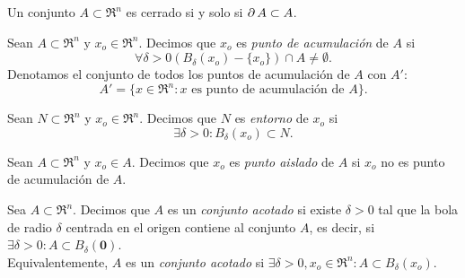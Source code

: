    \begin{propertie} \label{prop:cerrado_front}
    Un conjunto $A \subset \Re^n$ es cerrado si y solo si $\operatorname{\partial} A \subset A$.
   \end{propertie}
   
   \begin{definition}  \label{def:pto_acum}
    Sean $A \subset \Re^n \text{ y } x_o \in \Re^n$. Decimos que $x_o$ es \emph{punto de acumulaci\'on} de $A$ si
    \[
     \forall \delta > 0 \left( B_{\delta}(x_o) - \{ x_o \} \right) \cap A \ne \emptyset. 
    \]
    Denotamos el conjunto de todos los puntos de acumulaci\'on de $A$ con $A'$:
    \[
     A' = \{ x \in \Re^n : x \text{ es punto de acumulaci\'on de } A \}.
    \]
   
   \end{definition}
   
   \begin{definition}  \label{def:entorno}
    Sean $N \subset  \Re^n$ y $x_o \in \Re^n$. Decimos que $N$ es \emph{entorno} de $x_o$ si
    \[
     \exists \delta > 0 : B_{\delta}(x_o) \subset N.
    \]
   \end{definition}
   
   \begin{definition}  \label{def:pto_ais}
    Sean $A \subset  \Re^n$ y $x_o \in A$. Decimos que $x_o$ es \emph{punto aislado} de $A$ si $x_o$ no es punto de acumulaci\'on de $A$.
   \end{definition}
   
   \begin{definition}  \label{def:conj_acotado}
    Sea $A \subset \Re^n$. Decimos que $A$ es un \emph{conjunto acotado} si existe $\delta > 0$ tal que la bola de radio $\delta$  centrada en el origen contiene al conjunto $A$, es decir, si $\exists \delta > 0 : A \subset B_{\delta}(\mathbf{0})$.\\
    Equivalentemente, $A$ es un \emph{conjunto acotado} si $\exists \delta > 0, x_o \in \Re^n : A \subset B_{\delta}(x_o)$.
   \end{definition}
   